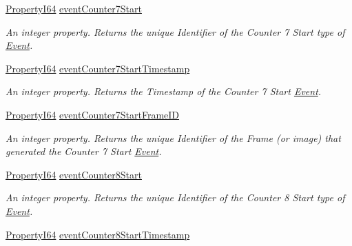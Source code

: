 \begin{DoxyCompactItemize}
\hyperlink{group___common_interface_ga81749b2696755513663492664a18a893}{Property\+I64} \hyperlink{classmv_i_m_p_a_c_t_1_1acquire_1_1_gen_i_cam_1_1_event_control_a4346846d417dcb71531c9058d87cbf16}{event\+Counter7\+Start}
\begin{DoxyCompactList}\small\item\em An integer property. Returns the unique Identifier of the Counter 7 Start type of \hyperlink{classmv_i_m_p_a_c_t_1_1acquire_1_1_event}{Event}. \end{DoxyCompactList}\item 
\hyperlink{group___common_interface_ga81749b2696755513663492664a18a893}{Property\+I64} \hyperlink{classmv_i_m_p_a_c_t_1_1acquire_1_1_gen_i_cam_1_1_event_control_ad3160ba228d21c89a92b445c025939f8}{event\+Counter7\+Start\+Timestamp}
\begin{DoxyCompactList}\small\item\em An integer property. Returns the Timestamp of the Counter 7 Start \hyperlink{classmv_i_m_p_a_c_t_1_1acquire_1_1_event}{Event}. \end{DoxyCompactList}\item 
\hyperlink{group___common_interface_ga81749b2696755513663492664a18a893}{Property\+I64} \hyperlink{classmv_i_m_p_a_c_t_1_1acquire_1_1_gen_i_cam_1_1_event_control_acfb4a4f5f62b66069d564b6d3e01be87}{event\+Counter7\+Start\+Frame\+I\+D}
\begin{DoxyCompactList}\small\item\em An integer property. Returns the unique Identifier of the Frame (or image) that generated the Counter 7 Start \hyperlink{classmv_i_m_p_a_c_t_1_1acquire_1_1_event}{Event}. \end{DoxyCompactList}\item 
\hyperlink{group___common_interface_ga81749b2696755513663492664a18a893}{Property\+I64} \hyperlink{classmv_i_m_p_a_c_t_1_1acquire_1_1_gen_i_cam_1_1_event_control_a8590f2982a5276b021b6a72b1c6c46ff}{event\+Counter8\+Start}
\begin{DoxyCompactList}\small\item\em An integer property. Returns the unique Identifier of the Counter 8 Start type of \hyperlink{classmv_i_m_p_a_c_t_1_1acquire_1_1_event}{Event}. \end{DoxyCompactList}\item 
\hyperlink{group___common_interface_ga81749b2696755513663492664a18a893}{Property\+I64} \hyperlink{classmv_i_m_p_a_c_t_1_1acquire_1_1_gen_i_cam_1_1_event_control_a904b27d7e8ef9024e3ad96eb91c52477}{event\+Counter8\+Start\+Timestamp}

\end{DoxyCompactItemize}
